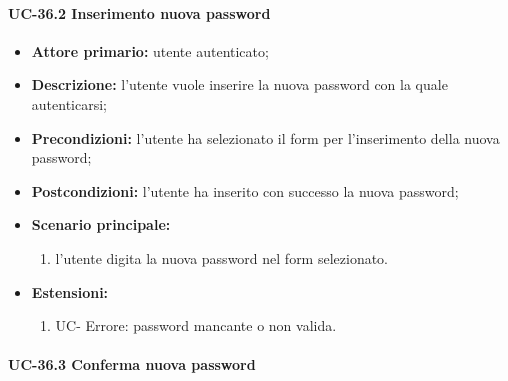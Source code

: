 \paragraph{UC-36.2 Inserimento nuova password}
	\begin{itemize}
		\item \textbf{Attore primario:} utente autenticato;

		\item \textbf{Descrizione:} l'utente vuole inserire la nuova password con la quale autenticarsi;

		\item \textbf{Precondizioni:} l'utente ha selezionato il form per l'inserimento della nuova password;

		\item \textbf{Postcondizioni:} l'utente ha inserito con successo la nuova password;

		\item \textbf{Scenario principale:}
	  		\begin{enumerate}
		  		\item l'utente digita la nuova password nel form selezionato.
	  		\end{enumerate}
	  	\item \textbf{Estensioni:}
	  		\begin{enumerate}
		  		\item UC- Errore: password mancante o non valida.
	  		\end{enumerate}
	\end{itemize}


\paragraph{UC-36.3 Conferma nuova password}

